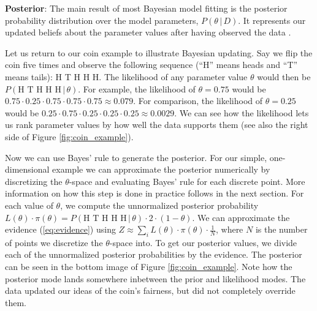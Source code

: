 \documentclass[12pt, a4paper]{report}
\begin{document}
\textbf{Posterior}: The main result of most Bayesian model fitting is the posterior probability distribution over the model parameters, $P(\theta \,|\, D)$.
It represents our updated beliefs about the parameter values after having observed the data \cite[36]{mcelreath}.

Let us return to our coin example to illustrate Bayesian updating.
Say we flip the coin five times and observe the following sequence (``H'' means heads and ``T'' means tails): H T H H H.
The likelihood of any parameter value $\theta$ would then be $P(\textrm{H T H H H} \, | \, \theta)$.
For example, the likelihood of $\theta = 0.75$ would be $0.75 \cdot 0.25 \cdot 0.75 \cdot 0.75 \cdot 0.75 \approx 0.079$.
For comparison, the likelihood of $\theta = 0.25$ would be $0.25 \cdot 0.75 \cdot 0.25 \cdot 0.25 \cdot 0.25 \approx 0.0029$.
We can see how the likelihood lets us rank parameter values by how well the data supports them (see also the right side of Figure \ref{fig:coin_example}).

Now we can use Bayes' rule to generate the posterior.
For our simple, one-dimensional example we can approximate the posterior numerically by discretizing the $\theta$-space and evaluating Bayes' rule for each discrete point.
More information on how this step is done in practice follows in the next section.
For each value of $\theta$, we compute the unnormalized posterior probability $L(\theta) \cdot \pi(\theta) = P(\textrm{H T H H H} \, | \, \theta) \cdot 2 \cdot (1 - \theta)$.
We can approximate the evidence (\ref{eq:evidence}) using $Z \approx \sum_{i} L(\theta) \cdot \pi(\theta) \cdot \frac{1}{N}$, where $N$ is the number of points we discretize the $\theta$-space into.
To get our posterior values, we divide each of the unnormalized posterior probabilities by the evidence.
The posterior can be seen in the bottom image of Figure \ref{fig:coin_example}.
Note how the posterior mode lands somewhere inbetween the prior and likelihood modes.
The data updated our ideas of the coin's fairness, but did not completely override them.
\end{document}
